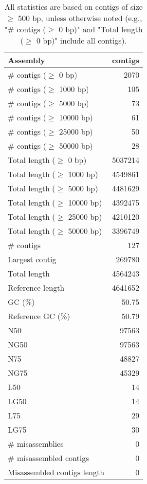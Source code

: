 \documentclass[12pt,a4paper]{article}
\begin{document}
\begin{table}[ht]
\begin{center}
\caption{All statistics are based on contigs of size $\geq$ 500 bp, unless otherwise noted (e.g., "\# contigs ($\geq$ 0 bp)" and "Total length ($\geq$ 0 bp)" include all contigs).}
\begin{tabular}{|l*{1}{|r}|}
\hline
Assembly & contigs \\ \hline
\# contigs ($\geq$ 0 bp) & 2070 \\ \hline
\# contigs ($\geq$ 1000 bp) & 105 \\ \hline
\# contigs ($\geq$ 5000 bp) & 73 \\ \hline
\# contigs ($\geq$ 10000 bp) & 61 \\ \hline
\# contigs ($\geq$ 25000 bp) & 50 \\ \hline
\# contigs ($\geq$ 50000 bp) & 28 \\ \hline
Total length ($\geq$ 0 bp) & 5037214 \\ \hline
Total length ($\geq$ 1000 bp) & 4549861 \\ \hline
Total length ($\geq$ 5000 bp) & 4481629 \\ \hline
Total length ($\geq$ 10000 bp) & 4392475 \\ \hline
Total length ($\geq$ 25000 bp) & 4210120 \\ \hline
Total length ($\geq$ 50000 bp) & 3396749 \\ \hline
\# contigs & 127 \\ \hline
Largest contig & 269780 \\ \hline
Total length & 4564243 \\ \hline
Reference length & 4641652 \\ \hline
GC (\%) & 50.75 \\ \hline
Reference GC (\%) & 50.79 \\ \hline
N50 & 97563 \\ \hline
NG50 & 97563 \\ \hline
N75 & 48827 \\ \hline
NG75 & 45329 \\ \hline
L50 & 14 \\ \hline
LG50 & 14 \\ \hline
L75 & 29 \\ \hline
LG75 & 30 \\ \hline
\# misassemblies & 0 \\ \hline
\# misassembled contigs & 0 \\ \hline
Misassembled contigs length & 0 \\ \hline

\end{tabular}
\end{center}
\end{table}
\end{document}
